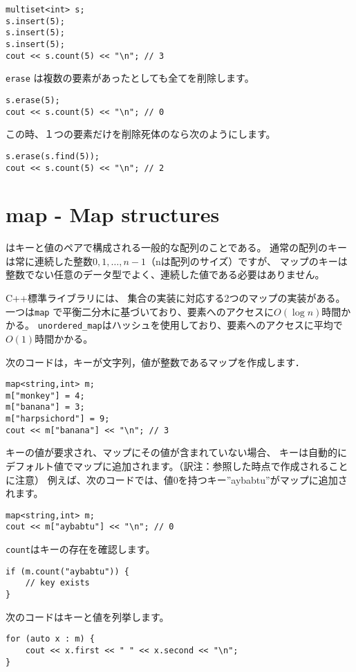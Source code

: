 \begin{lstlisting}
multiset<int> s;
s.insert(5);
s.insert(5);
s.insert(5);
cout << s.count(5) << "\n"; // 3
\end{lstlisting}

\texttt{erase} は複数の要素があったとしても全てを削除します。

\begin{lstlisting}
s.erase(5);
cout << s.count(5) << "\n"; // 0
\end{lstlisting}

この時、１つの要素だけを削除死体のなら次のようにします。

\begin{lstlisting}
s.erase(s.find(5));
cout << s.count(5) << "\n"; // 2
\end{lstlisting}

\section{map - Map structures}


はキーと値のペアで構成される一般的な配列のことである。
通常の配列のキーは常に連続した整数$0,1,\ldots,n-1$（nは配列のサイズ）ですが、
マップのキーは整数でない任意のデータ型でよく、連続した値である必要はありません。

C++標準ライブラリには、
集合の実装に対応する2つのマップの実装がある。
一つは\texttt{map} で平衡二分木に基づいており、要素へのアクセスに$O(\log n)$時間かかる。
\texttt{unordered\_map}はハッシュを使用しており、要素へのアクセスに平均で$O(1)$時間かかる。

次のコードは，キーが文字列，値が整数であるマップを作成します．

\begin{lstlisting}
map<string,int> m;
m["monkey"] = 4;
m["banana"] = 3;
m["harpsichord"] = 9;
cout << m["banana"] << "\n"; // 3
\end{lstlisting}

キーの値が要求され、マップにその値が含まれていない場合、
キーは自動的にデフォルト値でマップに追加されます。（訳注：参照した時点で作成されることに注意）
例えば、次のコードでは、値0を持つキー''aybabtu''がマップに追加されます。

\begin{lstlisting}
map<string,int> m;
cout << m["aybabtu"] << "\n"; // 0
\end{lstlisting}
\texttt{count}はキーの存在を確認します。
\begin{lstlisting}
if (m.count("aybabtu")) {
    // key exists
}
\end{lstlisting}
次のコードはキーと値を列挙します。
\begin{lstlisting}
for (auto x : m) {
    cout << x.first << " " << x.second << "\n";
}
\end{lstlisting}

